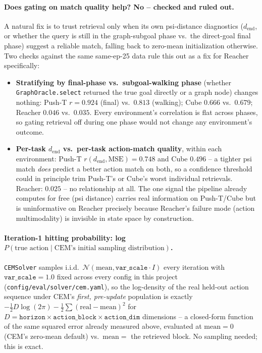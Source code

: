 \documentclass[11pt]{article}
\begin{document}
\paragraph{Does gating on match quality help? No -- checked and ruled out.} A natural fix is to
trust retrieval only when its own psi-distance diagnostics ($d_{\mathrm{end}}$, or whether the
query is still in the graph-subgoal phase vs.\ the direct-goal final phase) suggest a reliable
match, falling back to zero-mean initialization otherwise. Two checks against the same
same-ep-25 data rule this out as a fix for Reacher specifically:
\begin{itemize}[nosep]
  \item \textbf{Stratifying by final-phase vs.\ subgoal-walking phase} (whether
        \texttt{GraphOracle.select} returned the true goal directly or a graph node) changes
        nothing: Push-T $r=0.924$ (final) vs.\ $0.813$ (walking); Cube $0.666$ vs.\ $0.679$;
        Reacher $0.046$ vs.\ $0.035$. Every environment's correlation is flat across phases,
        so gating retrieval off during one phase would not change any environment's outcome.
  \item \textbf{Per-task $d_{\mathrm{end}}$ vs.\ per-task action-match quality}, within each
        environment: Push-T $r(d_{\mathrm{end}}, \mathrm{MSE})=0.748$ and
        Cube $0.496$ -- a tighter psi match \emph{does} predict a better action match on both,
        so a confidence threshold could in principle trim Push-T's or Cube's worst individual
        retrievals. Reacher: $0.025$ -- no relationship at all. The one signal the pipeline
        already computes for free (psi distance) carries real information on Push-T/Cube but
        is uninformative on Reacher precisely because Reacher's failure mode (action
        multimodality) is invisible in state space by construction.
\end{itemize}

\paragraph{Iteration-1 hitting probability: log $P(\text{true action} \mid \text{CEM's initial
sampling distribution})$.} \texttt{CEMSolver} samples i.i.d.\
$\mathcal{N}(\mathrm{mean}, \mathtt{var\_scale}\cdot I)$ every iteration with
$\mathtt{var\_scale}=1.0$ fixed across every config in this project
(\texttt{config/eval/solver/cem.yaml}), so the log-density of the real held-out action sequence
under CEM's \emph{first, pre-update} population is exactly
$-\tfrac12 D\log(2\pi) - \tfrac12\sum(\mathrm{real}-\mathrm{mean})^2$ for
$D=\mathtt{horizon}\times\mathtt{action\_block}\times\mathtt{action\_dim}$ dimensions -- a
closed-form function of the same squared error already measured above, evaluated at
$\mathrm{mean}=0$ (CEM's zero-mean default) vs.\ $\mathrm{mean}=$ the retrieved block. No
sampling needed; this is exact.
\end{document}
